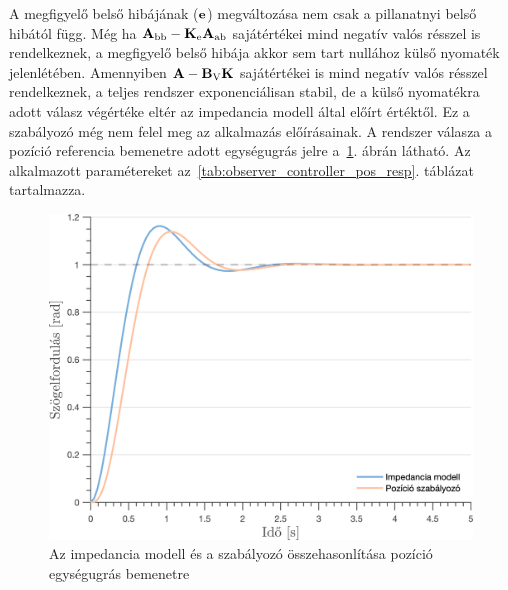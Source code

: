 A megfigyelő belső hibájának (\(\mathbf{e}\)) megváltozása nem csak a pillanatnyi belső hibától függ. Még ha \(\mathbf{A}_{\mathrm{bb}} - \mathbf{K}_{\mathrm{e}} \mathbf{A}_{\mathrm{ab}}\) sajátértékei
mind negatív valós résszel is rendelkeznek, a megfigyelő belső hibája akkor sem tart nullához külső nyomaték jelenlétében.
Amennyiben \(\mathbf{A} - \mathbf{B}_{\mathrm{V}} \mathbf{K}\) sajátértékei is mind negatív valós résszel rendelkeznek,
a teljes rendszer exponenciálisan stabil, de a külső nyomatékra adott válasz végértéke eltér az impedancia modell
által előírt értéktől. Ez a szabályozó még nem felel meg az alkalmazás előírásainak. A rendszer válasza a pozíció referencia bemenetre adott egységugrás jelre a~\ref{fig:observer_controller_pos_resp}. ábrán látható. 
Az alkalmazott paramétereket az~\ref{tab:observer_controller_pos_resp}. táblázat tartalmazza. 
\begin{figure}[ht]
    \begin{center}
    \includegraphics[width=\textwidth]{images/observer_controller_pos_resp.png}
    \caption{Az impedancia modell és a szabályozó összehasonlítása pozíció egységugrás bemenetre}\label{fig:observer_controller_pos_resp}
    \end{center}
\end{figure}

